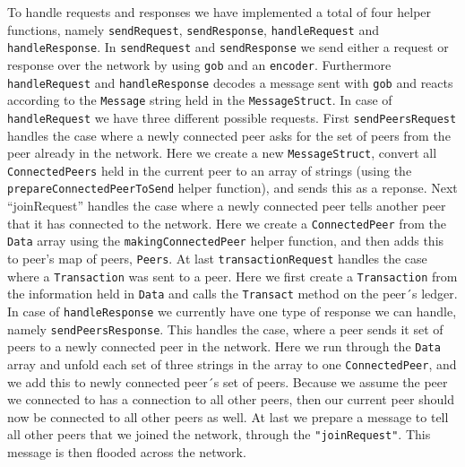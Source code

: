 \documentclass[
  paper=a4,
  ,captions=tableheading
]{scrartcl}
\newcommand{\passthrough}[1]{#1}
\begin{document}
To handle requests and responses we have implemented a total of four
helper functions, namely \passthrough{\lstinline!sendRequest!},
\passthrough{\lstinline!sendResponse!},
\passthrough{\lstinline!handleRequest!} and
\passthrough{\lstinline!handleResponse!}. In
\passthrough{\lstinline!sendRequest!} and
\passthrough{\lstinline!sendResponse!} we send either a request or
response over the network by using \passthrough{\lstinline!gob!} and an
\passthrough{\lstinline!encoder!}. Furthermore
\passthrough{\lstinline!handleRequest!} and
\passthrough{\lstinline!handleResponse!} decodes a message sent with
\passthrough{\lstinline!gob!} and reacts according to the
\passthrough{\lstinline!Message!} string held in the
\passthrough{\lstinline!MessageStruct!}. In case of
\passthrough{\lstinline!handleRequest!} we have three different possible
requests. First \passthrough{\lstinline!sendPeersRequest!} handles the
case where a newly connected peer asks for the set of peers from the
peer already in the network. Here we create a new
\passthrough{\lstinline!MessageStruct!}, convert all
\passthrough{\lstinline!ConnectedPeers!} held in the current peer to an
array of strings (using the
\passthrough{\lstinline!prepareConnectedPeerToSend!} helper function),
and sends this as a reponse. Next ``joinRequest'' handles the case where
a newly connected peer tells another peer that it has connected to the
network. Here we create a \passthrough{\lstinline!ConnectedPeer!} from
the \passthrough{\lstinline!Data!} array using the
\passthrough{\lstinline!makingConnectedPeer!} helper function, and then
adds this to peer's map of peers, \passthrough{\lstinline!Peers!}. At
last \passthrough{\lstinline!transactionRequest!} handles the case where
a \passthrough{\lstinline!Transaction!} was sent to a peer. Here we
first create a \passthrough{\lstinline!Transaction!} from the
information held in \passthrough{\lstinline!Data!} and calls the
\passthrough{\lstinline!Transact!} method on the peer´s ledger. In case
of \passthrough{\lstinline!handleResponse!} we currently have one type
of response we can handle, namely
\passthrough{\lstinline!sendPeersResponse!}. This handles the case,
where a peer sends it set of peers to a newly connected peer in the
network. Here we run through the \passthrough{\lstinline!Data!} array
and unfold each set of three strings in the array to one
\passthrough{\lstinline!ConnectedPeer!}, and we add this to newly
connected peer´s set of peers. Because we assume the peer we connected
to has a connection to all other peers, then our current peer should now
be connected to all other peers as well. At last we prepare a message to
tell all other peers that we joined the network, through the
\passthrough{\lstinline!"joinRequest"!}. This message is then flooded
across the network.
\end{document}
